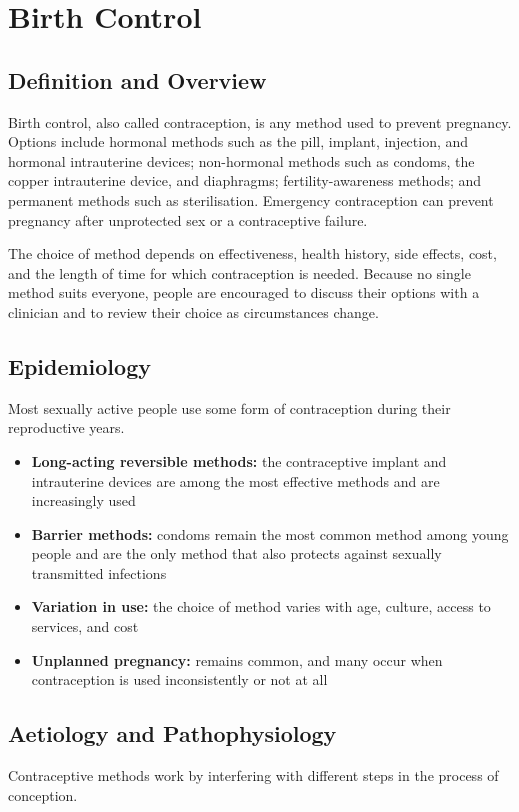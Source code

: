 \chapter{Birth Control}

\section*{Definition and Overview}
Birth control, also called contraception, is any method used to prevent pregnancy. Options include hormonal methods such as the pill, implant, injection, and hormonal intrauterine devices; non-hormonal methods such as condoms, the copper intrauterine device, and diaphragms; fertility-awareness methods; and permanent methods such as sterilisation. Emergency contraception can prevent pregnancy after unprotected sex or a contraceptive failure.

The choice of method depends on effectiveness, health history, side effects, cost, and the length of time for which contraception is needed. Because no single method suits everyone, people are encouraged to discuss their options with a clinician and to review their choice as circumstances change.

\section*{Epidemiology}
Most sexually active people use some form of contraception during their reproductive years.

\begin{itemize}
    \item \textbf{Long-acting reversible methods:} the contraceptive implant and intrauterine devices are among the most effective methods and are increasingly used
    \item \textbf{Barrier methods:} condoms remain the most common method among young people and are the only method that also protects against sexually transmitted infections
    \item \textbf{Variation in use:} the choice of method varies with age, culture, access to services, and cost
    \item \textbf{Unplanned pregnancy:} remains common, and many occur when contraception is used inconsistently or not at all
\end{itemize}

\section*{Aetiology and Pathophysiology}
Contraceptive methods work by interfering with different steps in the process of conception.

